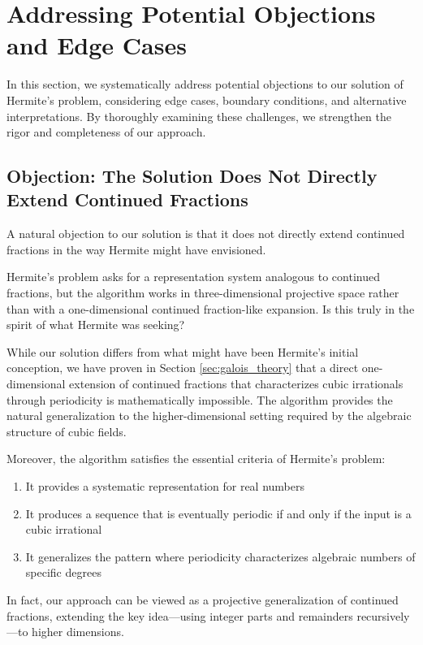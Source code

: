 \section{Addressing Potential Objections and Edge Cases}\label{sec:objections}

In this section, we systematically address potential objections to our solution of Hermite's problem, considering edge cases, boundary conditions, and alternative interpretations. By thoroughly examining these challenges, we strengthen the rigor and completeness of our approach.

\subsection{Objection: The Solution Does Not Directly Extend Continued Fractions}

A natural objection to our solution is that it does not directly extend continued fractions in the way Hermite might have envisioned.

\begin{objection}
Hermite's problem asks for a representation system analogous to continued fractions, but the \HAPD{} algorithm works in three-dimensional projective space rather than with a one-dimensional continued fraction-like expansion. Is this truly in the spirit of what Hermite was seeking?
\end{objection}

\begin{response}
While our solution differs from what might have been Hermite's initial conception, we have proven in Section \ref{sec:galois_theory} that a direct one-dimensional extension of continued fractions that characterizes cubic irrationals through periodicity is mathematically impossible. The \HAPD{} algorithm provides the natural generalization to the higher-dimensional setting required by the algebraic structure of cubic fields.

Moreover, the \HAPD{} algorithm satisfies the essential criteria of Hermite's problem:
\begin{enumerate}
    \item It provides a systematic representation for real numbers
    \item It produces a sequence that is eventually periodic if and only if the input is a cubic irrational
    \item It generalizes the pattern where periodicity characterizes algebraic numbers of specific degrees
\end{enumerate}

In fact, our approach can be viewed as a projective generalization of continued fractions, extending the key idea—using integer parts and remainders recursively—to higher dimensions.
\end{response}

